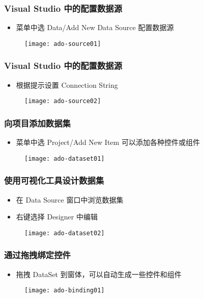 \begin{frame}
\frametitle{Visual Studio 中的配置数据源}
\begin{itemize}
\item 菜单中选 Data/Add New Data Source 配置数据源
\end{itemize}
\begin{figure}
  \centering
  \texttt{[image: ado-source01]}
\end{figure}

\end{frame}

\begin{frame}
\frametitle{Visual Studio 中的配置数据源}
\begin{itemize}
\item 根据提示设置 Connection String
\end{itemize}
\begin{figure}
  \centering
  \texttt{[image: ado-source02]}
\end{figure}
\end{frame}

\begin{frame}
\frametitle{向项目添加数据集}
\begin{itemize}
\item 菜单中选 Project/Add New Item 可以添加各种控件或组件
\end{itemize}
\begin{figure}
  \centering
  \texttt{[image: ado-dataset01]}
\end{figure}
\end{frame}

\begin{frame}
\frametitle{使用可视化工具设计数据集}
\begin{itemize}
\item 在 Data Source 窗口中浏览数据集
\item 右键选择 Designer 中编辑
\end{itemize}
\begin{figure}
  \centering
  \texttt{[image: ado-dataset02]}
\end{figure}
\end{frame}

\begin{frame}
\frametitle{通过拖拽绑定控件}
\begin{itemize}
\item 拖拽 DataSet 到窗体，可以自动生成一些控件和组件
\end{itemize}
\begin{figure}
  \centering
  \texttt{[image: ado-binding01]}
\end{figure}
\end{frame}

